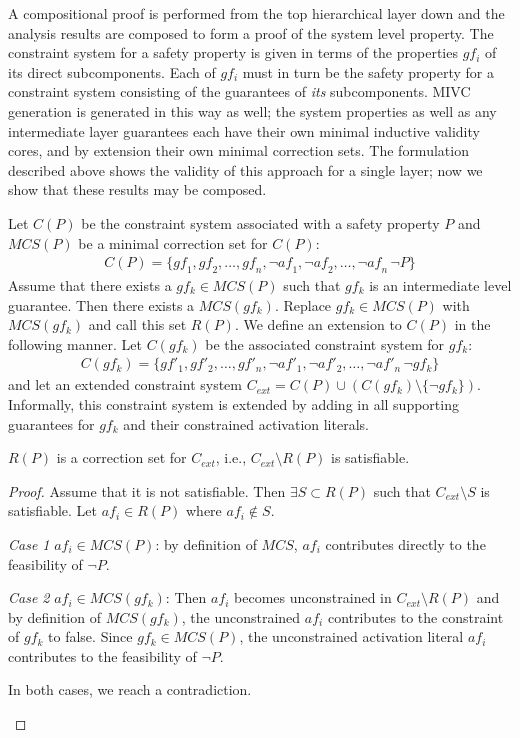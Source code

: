 A compositional proof is performed from the top hierarchical layer down and the analysis results are composed to form a proof of the system level property. The constraint system for a safety property is given in terms of the properties $gf_i$ of its direct subcomponents. Each of $gf_i$ must in turn be the safety property for a constraint system consisting of the guarantees of {\em its} subcomponents. MIVC generation is generated in this way as well; the system properties as well as any intermediate layer guarantees each have their own minimal inductive validity cores, and by extension their own minimal correction sets. The formulation described above shows the validity of this approach for a single layer; now we show that these results may be composed. 

Let $C(P)$ be the constraint system associated with a safety property $P$ and $MCS(P)$ be a minimal correction set for $C(P)$:
\begin{gather*}
C(P) = \{\mathit{gf}_1,  \mathit{gf}_2, \dots ,\mathit{gf}_n,  \neg \mathit{af}_1,  \neg \mathit{af}_2, \dots, \neg \mathit{af}_n\, \neg P\}
\end{gather*}
Assume that there exists a $gf_k \in MCS(P)$ such that $gf_k$ is an intermediate level guarantee. Then there exists a $MCS(gf_k)$. Replace $gf_k \in MCS(P)$ with $MCS(gf_k)$ and call this set $R(P)$. We define an extension to $C(P)$ in the following manner. Let $C(gf_k)$ be the associated constraint system for $gf_k$:
\begin{gather*}
C(gf_k) = \{\mathit{gf}'_1,  \mathit{gf}'_2, \dots ,\mathit{gf}'_n,  \neg \mathit{af}'_1,  \neg \mathit{af}'_2, \dots, \neg \mathit{af}'_n\, \neg gf_k\}
\end{gather*}
and let an extended constraint system $C_{ext} = C(P) \cup (C(gf_k) \setminus \{\neg gf_k\})$. Informally, this constraint system is extended by adding in all supporting guarantees for $gf_k$ and their constrained activation literals. 

\begin{lemma} $R(P)$ is a correction set for $C_{ext}$, i.e., $C_{ext} \setminus R(P)$ is satisfiable. 
\begin{proof}
Assume that it is not satisfiable. Then $\exists S \subset R(P)$ such that $C_{ext} \setminus S$ is satisfiable. Let $af_i \in R(P)$ where $af_i \not \in S$. 

\textit{Case 1} $af_i \in MCS(P)$: by definition of $MCS$, $af_i$ contributes directly to the feasibility of $\neg P$.

\textit{Case 2} $af_i \in MCS(gf_k)$: Then $af_i$ becomes unconstrained in $C_{ext} \setminus R(P)$ and by definition of $MCS(gf_k)$, the unconstrained $af_i$ contributes to the constraint of $gf_k$ to false. Since $gf_k \in MCS(P)$, the unconstrained activation literal $af_i$ contributes to the feasibility of $\neg P$. 

In both cases, we reach a contradiction. 

\label{lemma:corrSet1}
\end{proof}
\end{lemma}

